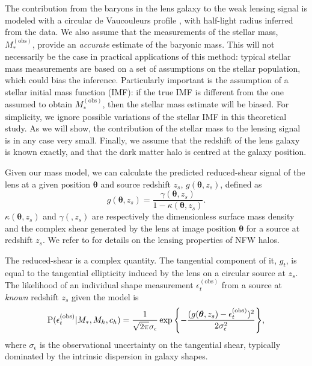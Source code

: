 \documentclass[usenatbib]{mnras}
\def\mobs{M_*^{\mathrm{(obs)}}}
\def\mstar{M_*}
\def\mhalo{M_{h}}
\def\chalo{c_{h}}
\def\sigmaeps{\sigma_\epsilon}
\def\epsobs{\epsilon_t^{(\mathrm{obs})}}
\def\pr{{\rm P}}
\begin{document}
The contribution from the baryons in the lens galaxy to the weak lensing signal is modeled with a circular de Vaucouleurs profile \citep{deV48}, with half-light radius inferred from the data.
We also assume that the measurements of the stellar mass, $\mobs$, provide an {\em accurate} estimate of the baryonic mass.
This will not necessarily be the case in practical applications of this method: typical stellar mass measurements are based on a set of assumptions on the stellar population, which could bias the inference. Particularly important is the assumption of a stellar initial mass function (IMF): if the true IMF is different from the one assumed to obtain $\mobs$, then the stellar mass estimate will be biased.
For simplicity, we ignore possible variations of the stellar IMF in this theoretical study. As we will show, the contribution of the stellar mass to the lensing signal is in any case very small. 
Finally, we assume that the redshift of the lens galaxy is known exactly, and that the dark matter halo is centred at the galaxy position.

Given our mass model, we can calculate the predicted reduced-shear signal of the lens at a given position $\boldsymbol\theta$ and source redshift $z_s$, $g(\boldsymbol\theta, z_s)$, 
defined as
\begin{equation}\label{eq:redshear}
g(\boldsymbol\theta, z_s) = \frac{\gamma(\boldsymbol\theta, z_s)}{1 - \kappa(\boldsymbol\theta, z_s)}.
\end{equation}
$\kappa(\boldsymbol\theta, z_s)$ and $\gamma(\boldsymbol, z_s)$ are respectively the dimensionless surface mass density and the complex shear generated by the lens at image position $\boldsymbol\theta$ for a source at redshift $z_s$.
We refer to \citet{Bar96, W+B2000} for details on the lensing properties of NFW halos.

The reduced-shear is a complex quantity. The tangential component of it, $g_t$, is equal to the tangential ellipticity induced by the lens on a circular source at $z_s$. 
The likelihood of an individual shape measurement $\epsobs$ from a source at {\em known} redshift $z_s$ given the model is
\begin{equation}\label{eq:onesourcelike}
\pr(\epsobs | \mstar, \mhalo, \chalo) = \frac{1}{\sqrt{2\pi}{\sigmaeps}}\exp{\left\{-\frac{(g(\boldsymbol\theta, z_s) - \epsobs)^2}{2\sigmaeps^2}\right\}},
\end{equation}
where $\sigmaeps$ is the observational uncertainty on the tangential shear, typically dominated by the intrinsic dispersion in galaxy shapes. 
\end{document}

